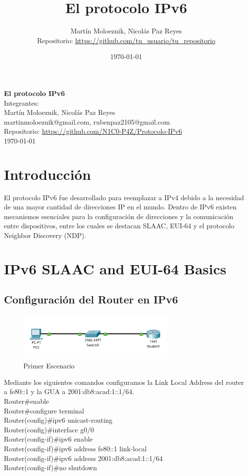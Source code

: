 \documentclass[a4paper,12pt]{article}
\title{El protocolo IPv6}
\author{Martín Moloeznik, Nicolás Paz Reyes\\[0.5em]
Repositorio: \url{https://github.com/tu_usuario/tu_repositorio}}
\date{\today}
\begin{document}
\begin{titlepage}
  \centering
  \vspace*{2cm}
  {\large \textbf{El protocolo IPv6}}\\[1.5cm]
  
  {\large Integrantes:}\\
   \bigskip
  {\large Martín Moloeznik, Nicolás Paz Reyes} \\[0.5cm]
  {\large {martinmoloeznik@gmail.com}, {rubenpaz2105@gmail.com}} \\[0.5cm]
  \bigskip
  {\large Repositorio: \url{https://github.com/N1C0-P4Z/Protocolo-IPv6}}\\[1cm]
  
  \vfill
  {\large \today}
\end{titlepage}

\tableofcontents
\newpage

\section*{Introducción}
\setcounter{section}{0}
El protocolo IPv6 fue desarrollado para reemplazar a IPv4 debido a la necesidad de una mayor cantidad de direcciones IP en el mundo. Dentro de IPv6 existen mecanismos esenciales para la configuración de direcciones y la comunicación entre dispositivos, entre los cuales se destacan SLAAC, EUI-64 y el protocolo Neighbor Discovery (NDP).

\section{IPv6 SLAAC and EUI-64 Basics}
\subsection{Configuración del Router en IPv6}
\begin{figure}[h]
  \centering
  \includegraphics[width=0.7\textwidth]{imagenes/lab1.png}
  \caption{Primer Escenario}
\end{figure}
\FloatBarrier
Mediante los siguientes comandos configuramos la Link Local Address del router a fe80::1 y la GUA a 2001:db8:acad:1::1/64.\\
\noindent Router\#enable\\
Router\#configure terminal\\
Router(config)\#ipv6 unicast-routing\\
Router(config)\#interface g0/0\\
Router(config-if)\#ipv6 enable\\
Router(config-if)\#ipv6 address fe80::1 link-local\\
Router(config-if)\#ipv6 address 2001:db8:acad:1::1/64\\
Router(config-if)\#no shutdown\\
\end{document}
